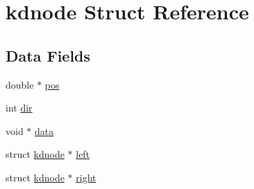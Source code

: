 \hypertarget{structkdnode}{\section{kdnode Struct Reference}
\label{structkdnode}
}
\subsection*{Data Fields}
\begin{DoxyCompactItemize}
\item 
double $\ast$ \hyperlink{structkdnode_a52c94a594d1665e9dfea5cfec629e194}{pos}
\item 
int \hyperlink{structkdnode_aa3b02f2e7995f08cd16a85ea93e1fc80}{dir}
\item 
void $\ast$ \hyperlink{structkdnode_a6a63d35d219efceb75941dcd0d9c7f6d}{data}
\item 
struct \hyperlink{structkdnode}{kdnode} $\ast$ \hyperlink{structkdnode_ace3a2b66b16cf107e27885c9488c5f9d}{left}
\item 
struct \hyperlink{structkdnode}{kdnode} $\ast$ \hyperlink{structkdnode_a560fdae1b98325057e95c817f76bee67}{right}
\end{DoxyCompactItemize}


